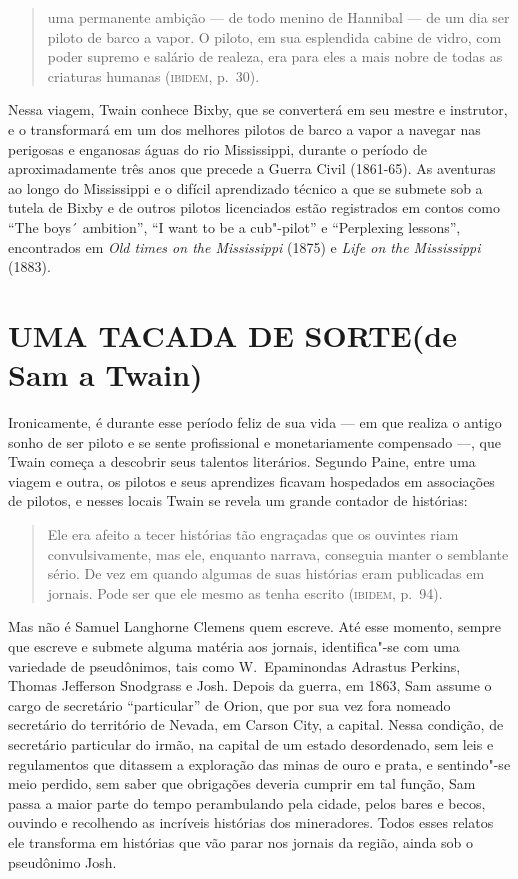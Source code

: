 \begin{quote}
uma permanente ambição
--- de todo menino de Hannibal --- de um dia ser piloto de barco a vapor. O
piloto, em sua esplendida cabine de vidro, com poder supremo e salário de
realeza, era para eles a mais nobre de todas as criaturas
humanas (\textsc{ibidem}, p.~30).
\end{quote}

Nessa viagem, Twain conhece Bixby, que se converterá em seu mestre e
instrutor, e o transformará em um dos melhores pilotos de barco a vapor a
navegar nas perigosas e enganosas águas do rio Mississippi, durante o
período de aproximadamente três anos que precede a Guerra Civil
(1861-65). As aventuras ao longo do Mississippi e o difícil aprendizado
técnico a que se submete sob a tutela de Bixby e de outros pilotos
licenciados estão registrados em contos como ``The
boys´ ambition'', ``I want to be a cub"-pilot'' e ``Perplexing
lessons'', encontrados em \textit{Old times on the Mississippi}
(1875) e \textit{Life on the Mississippi} (1883).

\section{UMA TACADA DE SORTE\break (de Sam a Twain)}

Ironicamente, é durante esse período feliz de sua vida --- em que realiza
o antigo sonho de ser piloto e se sente profissional e monetariamente
compensado ---, que Twain começa a descobrir seus talentos literários.
Segundo Paine, entre uma viagem e outra, os pilotos e seus aprendizes
ficavam hospedados em associações de pilotos, e nesses locais Twain se
revela um grande contador de histórias:

\begin{quote}
Ele era afeito a
tecer histórias tão engraçadas que os ouvintes riam convulsivamente, mas
ele, enquanto narrava, conseguia manter o semblante sério. De vez em
quando algumas de suas histórias eram publicadas em jornais. Pode ser
que ele mesmo as tenha escrito (\textsc{ibidem}, p.~94).
\end{quote}

Mas não é Samuel Langhorne Clemens quem escreve. Até esse momento, sempre que
escreve e submete alguma matéria aos jornais, identifica"-se com uma
variedade de pseudônimos, tais como W.~Epaminondas Adrastus Perkins,
Thomas Jefferson Snodgrass e Josh. Depois da guerra, em 1863, Sam assume o
cargo de secretário ``particular'' de
Orion, que por sua vez fora nomeado secretário do território de Nevada,
em Carson City, a capital. Nessa condição, de secretário particular do
irmão, na capital de um estado desordenado, sem leis e regulamentos que
ditassem a exploração das minas de ouro e prata, e sentindo"-se meio
perdido, sem saber que obrigações deveria cumprir em tal função, Sam passa
a maior parte do tempo perambulando pela cidade, pelos bares e becos,
ouvindo e recolhendo as incríveis histórias dos mineradores. Todos
esses relatos ele transforma em histórias que vão parar nos jornais da
região, ainda sob o pseudônimo Josh.

